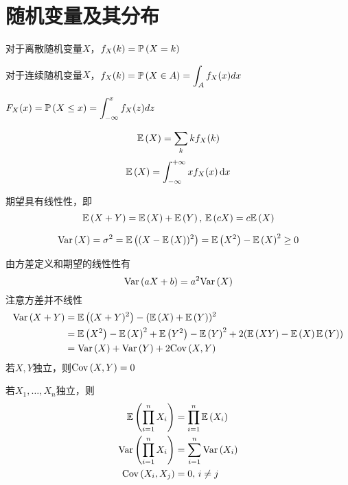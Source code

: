 \section{随机变量及其分布}
\begin{definition}
对于离散随机变量$X$，$f_X(k)=\pr{X=k}$
\end{definition}
\begin{definition}
对于连续随机变量$X$，$\displaystyle f_X(k)=\pr{X\in A}=\int_Af_X(x)dx$
\end{definition}
\begin{definition}
$F_X(x)=\pr{X\leq x}=\displaystyle \int_{-\infty}^xf_X(z)dz$
\end{definition}
\begin{definition}[期望]
\[\E{X}=\sum_k kf_X(k)\]
\[\E{X}=\intab{-\infty}{+\infty}{xf_X(x)}\]
\end{definition}
\par 期望具有线性性，即
\[\E{X+Y}=\E{X}+\E{Y},\,\E{cX}=c\E{X}\]
\begin{definition}[方差]
\[\Var{X}=\sigma^2=\E{(X-\E{X})^2}=\E{X^2}-\E{X}^2\geq 0\]
\end{definition}
由方差定义和期望的线性性有
\[\Var{aX+b}=a^2\Var{X}\]
注意方差并不线性
\[\begin{aligned}
\Var{X+Y}&=\E{(X+Y)^2}-(\E{X}+\E{Y})^2\\
&=\E{X^2}-\E{X}^2+\E{Y^2}-\E{Y}^2+2(\E{XY}-\E{X}\E{Y})\\
&=\Var{X}+\Var{Y}+2\Cov{X,Y}
\end{aligned}\]
若$X,Y$独立，则$\Cov{X,Y}=0$
\begin{theorem}
若$X_1,\ldots,X_n$独立，则
\[\begin{aligned}
\E{\prod_{i=1}^nX_i}&=\prod_{i=1}^n\E{X_i}\\
\Var{\prod_{i=1}^nX_i}&=\sum_{i=1}^n\Var{X_i}\\
\Cov{X_i,X_j}&=0,\,i\ne j
\end{aligned}\]
\end{theorem}

